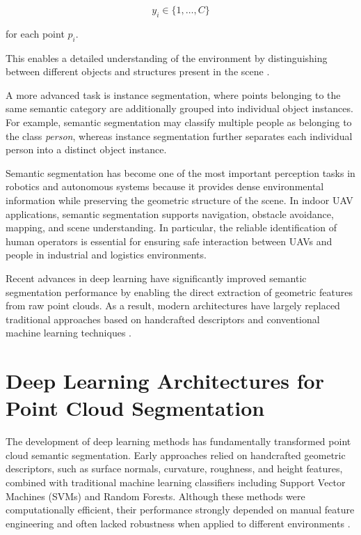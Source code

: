 \[
y_i \in \{1,\ldots,C\}
\]

for each point \(p_i\).

This enables a detailed understanding of the environment by distinguishing between different objects and structures present in the scene \cite{Guo2020DeepLearningSurvey,Li2020DeepLearningLiDARReview}.

A more advanced task is instance segmentation, where points belonging to the same semantic category are additionally grouped into individual object instances. For example, semantic segmentation may classify multiple people as belonging to the class \textit{person}, whereas instance segmentation further separates each individual person into a distinct object instance.

Semantic segmentation has become one of the most important perception tasks in robotics and autonomous systems because it provides dense environmental information while preserving the geometric structure of the scene. In indoor UAV applications, semantic segmentation supports navigation, obstacle avoidance, mapping, and scene understanding. In particular, the reliable identification of human operators is essential for ensuring safe interaction between UAVs and people in industrial and logistics environments.

Recent advances in deep learning have significantly improved semantic segmentation performance by enabling the direct extraction of geometric features from raw point clouds. As a result, modern architectures have largely replaced traditional approaches based on handcrafted descriptors and conventional machine learning techniques \cite{Qi2017PointNet,Qi2017PointNetPP}.


\section{Deep Learning Architectures for Point Cloud Segmentation}
\label{sec:dl_architectures}

The development of deep learning methods has fundamentally transformed point cloud semantic segmentation. Early approaches relied on handcrafted geometric descriptors, such as surface normals, curvature, roughness, and height features, combined with traditional machine learning classifiers including Support Vector Machines (SVMs) and Random Forests. Although these methods were computationally efficient, their performance strongly depended on manual feature engineering and often lacked robustness when applied to different environments \cite{Guo2020DeepLearningSurvey,Li2020DeepLearningLiDARReview,Zhao2021TechnicalSurveyPointCloudClustering}.

